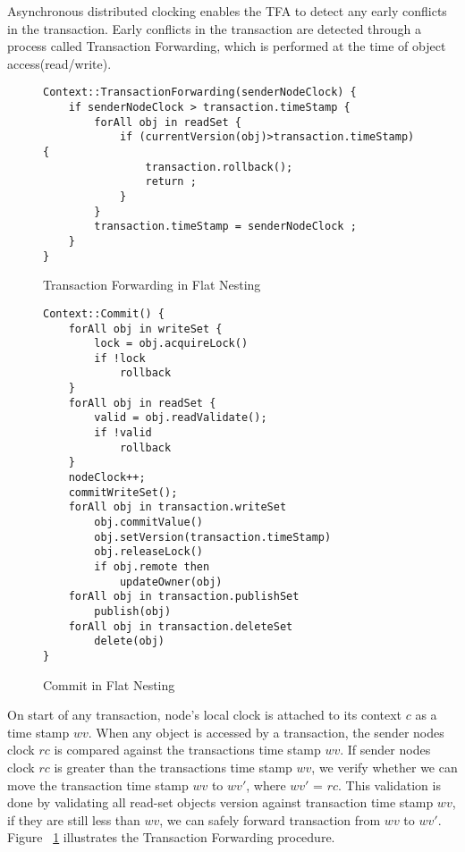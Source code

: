 \documentclass[12pt,english]{report}
\begin{document}
Asynchronous distributed clocking enables the TFA to detect any early conflicts in the transaction. Early conflicts in the transaction are detected through a process called Transaction Forwarding, which is performed at the time of object access(read/write). 

\begin{figure}
\begin{minipage}[b]{0.9\linewidth}\centering
\begin{lstlisting}
Context::TransactionForwarding(senderNodeClock) {
	if senderNodeClock > transaction.timeStamp {
		forAll obj in readSet {
			if (currentVersion(obj)>transaction.timeStamp) { 
				transaction.rollback();
				return ;		
			}
		}
		transaction.timeStamp = senderNodeClock ; 
	}
}
\end{lstlisting}
\end{minipage}
\caption{Transaction Forwarding in Flat Nesting}
\label{Fig:FlatTFA}
\end{figure}

\begin{figure}[H]
\begin{minipage}[b]{0.9\linewidth}\centering
\begin{lstlisting}
Context::Commit() {
	forAll obj in writeSet {
		lock = obj.acquireLock()
		if !lock
			rollback
	}
	forAll obj in readSet {
		valid = obj.readValidate();
		if !valid
			rollback
	}
	nodeClock++;
	commitWriteSet();
	forAll obj in transaction.writeSet
		obj.commitValue()
 		obj.setVersion(transaction.timeStamp)
 		obj.releaseLock()
 		if obj.remote then
 			updateOwner(obj)
	forAll obj in transaction.publishSet
		publish(obj)
	forAll obj in transaction.deleteSet
		delete(obj)
}
\end{lstlisting}
\end{minipage}
\caption{Commit in Flat Nesting}
\label{Fig:FlatCommit}
\end{figure}

On start of any transaction, node's local clock is attached to its context $c$ as a time stamp $wv$. When any object is accessed by a transaction, the sender nodes clock $rc$ is compared against the transactions time stamp $wv$. If sender nodes clock $rc$ is greater than the transactions time stamp $wv$, we verify whether we can move the transaction time stamp $wv$ to $wv'$, where $wv'$ = $rc$. This validation is done by validating all read-set objects version against transaction time stamp $wv$, if they are still less than $wv$, we can safely forward transaction from $wv$ to $wv'$. Figure ~\ref{Fig:FlatTFA} illustrates the Transaction Forwarding procedure.
\end{document}
